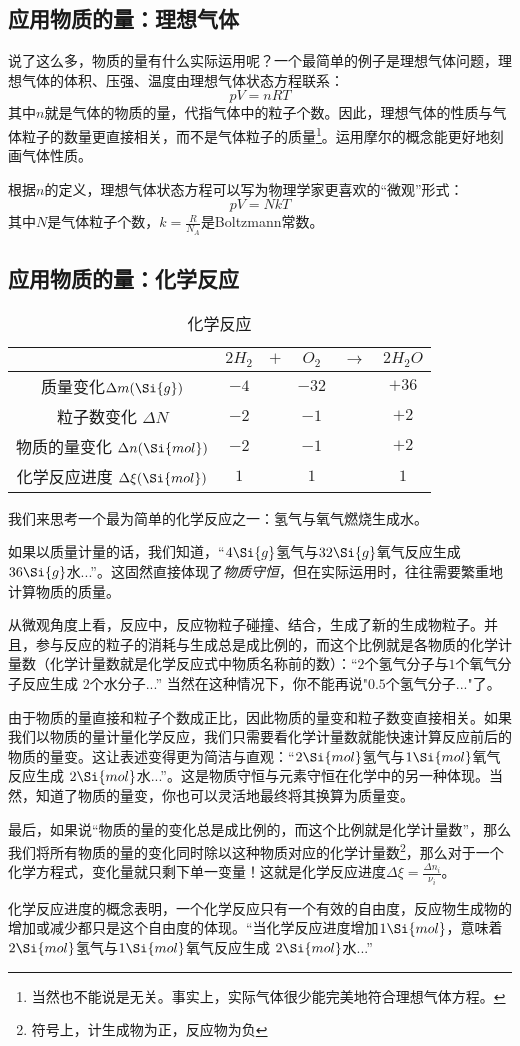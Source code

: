\subsection{应用物质的量：理想气体}
说了这么多，物质的量有什么实际运用呢？一个最简单的例子是理想气体问题，理想气体的体积、压强、温度由理想气体状态方程联系：
$$pV=nRT$$
其中$n$就是气体的物质的量，代指气体中的粒子个数。因此，理想气体的性质与气体粒子的数量更直接相关，而不是气体粒子的质量\footnote{当然也不能说是无关。事实上，实际气体很少能完美地符合理想气体方程。}。运用摩尔的概念能更好地刻画气体性质。

根据$n$的定义，理想气体状态方程可以写为物理学家更喜欢的“微观”形式：
$$pV=NkT$$
其中$N$是气体粒子个数，$k=\frac{R}{N_A}$是Boltzmann常数。

\subsection{应用物质的量：化学反应}
\begin{table}[ht]
\centering
\caption{化学反应}\label{tab_MOLE_1}
\begin{tabular}{|c|c|c|c|c|c|}
\hline
 & $2H_2$ & $+$ & $O_2$ & $\rightarrow$ & $2H_2O$ \\
\hline
质量变化$\Delta m (\Si{g})$ & $-4$ & & $-32$ & & $+36$ \\
\hline
粒子数变化 $\Delta N$ & $-2$ &  & $-1$ & & $+2$ \\
\hline
物质的量变化 $\Delta n (\Si{mol})$ & $-2$ &  & $-1$ & & $+2$ \\
\hline
化学反应进度 $\Delta \xi (\Si{mol})$ & $1$ & & $1$ & & $1$ \\
\hline
\end{tabular}
\end{table}
我们来思考一个最为简单的化学反应之一：氢气与氧气燃烧生成水。

如果以质量计量的话，我们知道，“$4\Si{g}$氢气与$32\Si{g}$氧气反应生成 $36\Si{g}$水...”。这固然直接体现了\textsl{物质守恒}，但在实际运用时，往往需要繁重地计算物质的质量。

从微观角度上看，反应中，反应物粒子碰撞、结合，生成了新的生成物粒子。并且，参与反应的粒子的消耗与生成总是成比例的，而这个比例就是各物质的化学计量数（化学计量数就是化学反应式中物质名称前的数）：“$2$个氢气分子与$1$个氧气分子反应生成 $2$个水分子...” 当然在这种情况下，你不能再说"$0.5$个氢气分子..."了。

由于物质的量直接和粒子个数成正比，因此物质的量变和粒子数变直接相关。如果我们以物质的量计量化学反应，我们只需要看化学计量数就能快速计算反应前后的物质的量变。这让表述变得更为简洁与直观：“$2\Si{mol}$氢气与$1\Si{mol}$氧气反应生成 $2\Si{mol}$水...”。这是物质守恒与元素守恒在化学中的另一种体现。当然，知道了物质的量变，你也可以灵活地最终将其换算为质量变。

最后，如果说“物质的量的变化总是成比例的，而这个比例就是化学计量数”，那么我们将所有物质的量的变化同时除以这种物质对应的化学计量数\footnote{符号上，计生成物为正，反应物为负}，那么对于一个化学方程式，变化量就只剩下单一变量！这就是化学反应进度$\Delta \xi = \frac{\Delta n_i}{\nu_i}$。

化学反应进度的概念表明，一个化学反应只有一个有效的自由度，反应物生成物的增加或减少都只是这个自由度的体现。“当化学反应进度增加$1\Si{mol}$，意味着$2\Si{mol}$氢气与$1\Si{mol}$氧气反应生成 $2\Si{mol}$水...”
